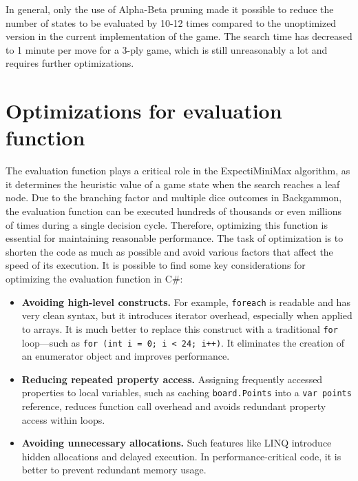 In general, only the use of Alpha-Beta pruning made it possible to reduce the number of states to be evaluated by 10-12 times compared to the unoptimized version in the current implementation of the game. The search time has decreased to 1 minute per move for a 3-ply game, which is still unreasonably a lot and requires further optimizations.

\section{Optimizations for evaluation function}

The evaluation function plays a critical role in the ExpectiMiniMax algorithm, as it determines the heuristic value of a game state when the search reaches a leaf node. Due to the branching factor and multiple dice outcomes in Backgammon, the evaluation function can be executed hundreds of thousands or even millions of times during a single decision cycle. Therefore, optimizing this function is essential for maintaining reasonable performance. The task of optimization is to shorten the code as much as possible and avoid various factors that affect the speed of its execution.
\newpage
It is possible to find some key considerations for optimizing the evaluation function in C\#:

\begin{itemize}
    \item \textbf{Avoiding high-level constructs.}
    For example, \texttt{foreach} is readable and has very clean syntax, but it introduces iterator overhead, especially when applied to arrays. It is much better to replace this construct with a traditional \texttt{for} loop—such as \texttt{for (int i = 0; i < 24; i++)}. It eliminates the creation of an enumerator object and improves performance.

    \item \textbf{Reducing repeated property access.} 
    Assigning frequently accessed properties to local variables, such as caching \texttt{board.Points} into a \texttt{var points} reference, reduces function call overhead and avoids redundant property access within loops.

    \item \textbf{Avoiding unnecessary allocations.} 
    Such features like LINQ introduce hidden allocations and delayed execution. In performance-critical code, it is better to prevent redundant memory usage.

\end{itemize}

